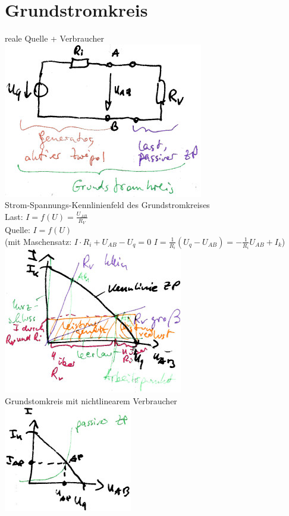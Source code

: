 \section{Grundstromkreis}
reale Quelle + Verbraucher\\
\includegraphics[scale=1.5]{Abbildungen/ABB310}\\
Strom-Spannungs-Kennlinienfeld des Grundstromkreises\\
Last: $I=f(U)=\frac{U_{AB}}{R_V}$\\
Quelle: $I=f(U)$ \\
(mit Maschensatz: $I\cdot R_i + U_{AB}-U_q=0$ \qquad $I=\frac{1}{R_i}(U_q-U_{AB})=-\frac{1}{R_i}U_{AB}+I_k$)\\
\includegraphics[scale=1.5]{Abbildungen/ABB311}\\
Grundstomkreis mit nichtlinearem Verbraucher\\
\includegraphics[scale=1.5]{Abbildungen/ABB312}\\
